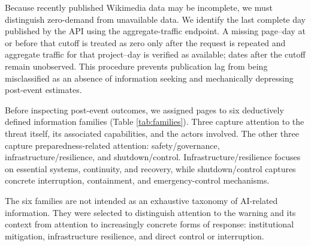 \elsevierclasstrue\documentclass[preprint,12pt]{elsarticle}%
\begin{document}
Because recently published Wikimedia data may be incomplete, we must distinguish zero-demand from unavailable data. We identify the last complete day published by the API using the aggregate-traffic endpoint. A missing page--day at or before that cutoff is treated as zero only after the request is repeated and aggregate traffic for that project--day is verified as available; dates after the cutoff remain unobserved. This procedure prevents publication lag from being misclassified as an absence of information seeking and mechanically depressing post-event estimates.

Before inspecting post-event outcomes, we assigned pages to six deductively defined information families (Table \ref{tab:families}). Three capture attention to the threat itself, its associated capabilities, and the actors involved. The other three capture preparedness-related attention: safety/governance, infrastructure/resilience, and shutdown/control. Infrastructure/resilience focuses on essential systems, continuity, and recovery, while shutdown/control captures concrete interruption, containment, and emergency-control mechanisms.

The six families are not intended as an exhaustive taxonomy of AI-related information. They were selected to distinguish attention to the warning and its context from attention to increasingly concrete forms of response: institutional mitigation, infrastructure resilience, and direct control or interruption.
\end{document}
